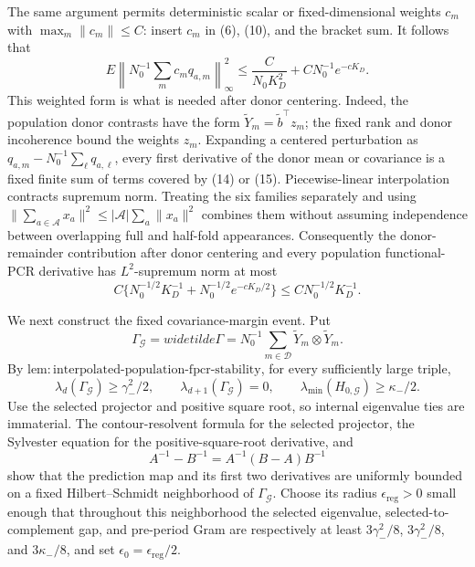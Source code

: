 The same argument permits deterministic scalar or fixed-dimensional weights
\(c_m\) with \(\max_m\|c_m\|\leq C\): insert \(c_m\) in (6), (10), and
the bracket sum.  It follows that
\[
 E\left\|N_0^{-1}\sum_m c_mq_{a,m}\right\|_\infty^2
 \leq\frac{C}{N_0K_D^2}+C N_0^{-1}e^{-cK_D}.           \tag{15}
\]
This weighted form is what is needed after donor centering.  Indeed, the
population donor contrasts have the form
\(\widetilde Y_m=\widetilde b^{\top}z_m\); the fixed rank and donor
incoherence bound the weights \(z_m\).  Expanding a centered perturbation as
\(q_{a,m}-N_0^{-1}\sum_\ell q_{a,\ell}\), every first derivative of the
donor mean or covariance is a fixed finite sum of terms covered by (14) or
(15).  Piecewise-linear interpolation contracts supremum norm.  Treating the
six families separately and using
\(\|\sum_{a\in\mathscr A}x_a\|^2\leq
|\mathscr A|\sum_a\|x_a\|^2\) combines them without assuming independence
between overlapping full and half-fold appearances.  Consequently the
donor-remainder contribution after donor centering and every population
functional-PCR derivative has \(L^2\)-supremum norm at most
\[
 C\{N_0^{-1/2}K_D^{-1}+N_0^{-1/2}e^{-cK_D/2}\}
 \leq C N_0^{-1/2}K_D^{-1}.                            \tag{16}
\]

We next construct the fixed covariance-margin event.  Put
\[
 \Gamma_{\mathcal G}=widetilde\Gamma
 =N_0^{-1}\sum_{m\in\mathcal D}
   \widetilde Y_m\otimes\widetilde Y_m.
\]
By
\(\mathrm{lem:interpolated\mbox{-}population\mbox{-}fpcr\mbox{-}stability}\),
for every sufficiently large triple,
\[
 \lambda_d(\Gamma_{\mathcal G})\geq\gamma_-^2/2,
 \qquad \lambda_{d+1}(\Gamma_{\mathcal G})=0,
 \qquad \lambda_{\min}(H_{0,\mathcal G})\geq\kappa_-/2. \tag{17}
\]
Use the selected projector and positive square root, so internal eigenvalue
ties are immaterial.  The contour-resolvent formula for the selected
projector, the Sylvester equation for the positive-square-root derivative,
and
\[
 A^{-1}-B^{-1}=A^{-1}(B-A)B^{-1}                       \tag{18}
\]
show that the prediction map and its first two derivatives are uniformly
bounded on a fixed Hilbert--Schmidt neighborhood of
\(\Gamma_{\mathcal G}\).  Choose its radius
\(\epsilon_{\mathrm{reg}}>0\) small enough that throughout this neighborhood
the selected eigenvalue, selected-to-complement gap, and pre-period Gram are
respectively at least \(3\gamma_-^2/8\), \(3\gamma_-^2/8\), and
\(3\kappa_-/8\), and set \(\epsilon_0=\epsilon_{\mathrm{reg}}/2\).

